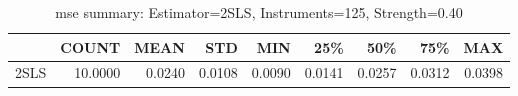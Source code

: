 \begin{table}[ht]
\centering
\caption{mse summary: Estimator=2SLS, Instruments=125, Strength=0.40}
\begin{tabular}{lrrrrrrrr}
\toprule
 & COUNT & MEAN & STD & MIN & 25\% & 50\% & 75\% & MAX \\
\midrule
2SLS & 10.0000 & 0.0240 & 0.0108 & 0.0090 & 0.0141 & 0.0257 & 0.0312 & 0.0398 \\
\bottomrule
\end{tabular}
\end{table}
